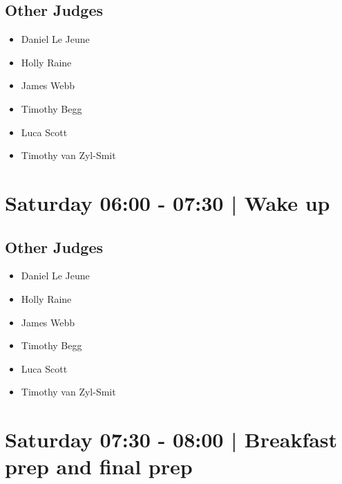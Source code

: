 \documentclass[10pt, A5]{article}
\begin{document}
                
        \subsection*{Other Judges}
        
            \begin{itemize}
                            \item Daniel Le Jeune
                            \item Holly Raine
                            \item James Webb
                            \item Timothy Begg
                            \item Luca Scott
                            \item Timothy van Zyl-Smit
                        \end{itemize}
        

            \section*{Saturday 06:00
        -
        07:30
        |
         Wake up}
        
                
        \subsection*{Other Judges}
        
            \begin{itemize}
                            \item Daniel Le Jeune
                            \item Holly Raine
                            \item James Webb
                            \item Timothy Begg
                            \item Luca Scott
                            \item Timothy van Zyl-Smit
                        \end{itemize}
        

            \section*{Saturday 07:30
        -
        08:00
        |
         Breakfast prep and final prep}
        
                
\end{document}
